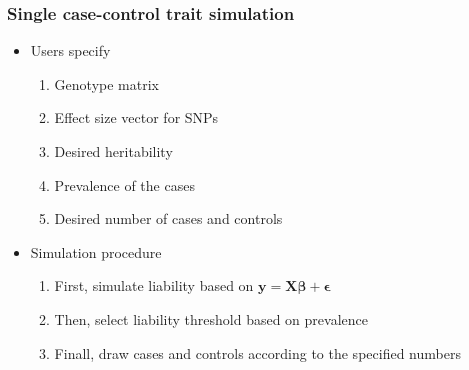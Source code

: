 \documentclass[12pt]{article}
\newcommand{\by}{\boldsymbol{y}}
\newcommand{\bX}{\boldsymbol{X}}
\newcommand{\bbeta}{\boldsymbol{\beta}}
\newcommand{\bepsilon}{\boldsymbol{\epsilon}}
\begin{document}
\begin{spacing}{1.0}
\subsubsection{Single case-control trait simulation}
\begin{itemize}
    \item Users specify
        \begin{enumerate}
            \item Genotype matrix
            \item Effect size vector for SNPs
            \item Desired heritability
            \item Prevalence of the cases
            \item Desired number of cases and controls
        \end{enumerate}
    \item Simulation procedure
    \begin{enumerate}
        \item First, simulate liability based on $\by = \bX \bbeta + \bepsilon$
        \item Then, select liability threshold based on prevalence
        \item Finall, draw cases and controls according to the specified numbers
    \end{enumerate}
\end{itemize}


\end{spacing}
\end{document}
